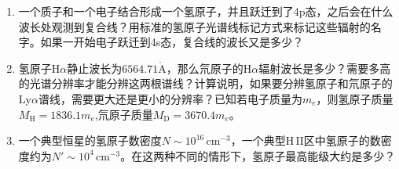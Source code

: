 \documentclass[a4paper]{article}
\begin{document}
\begin{enumerate}
    \item[4.] 一个质子和一个电子结合形成一个氢原子，并且跃迁到了4p态，之后会在什么波长处观测到复合线？用标准的氢原子光谱线标记方式来标记这些辐射的名字。如果一开始电子跃迁到4s态，复合线的波长又是多少？

    \item[5.] 氢原子$\mathrm{H}\alpha$静止波长为$6564.71\mathring{\mathrm{A}}$，那么氘原子的$\mathrm{H}\alpha$辐射波长是多少？需要多高的光谱分辨率才能分辨这两根谱线？计算说明，如果要分辨氢原子和氘原子的$\mathrm{Ly}\alpha$谱线，需要更大还是更小的分辨率？已知若电子质量为$m_e$，则氢原子质量$M_{\mathrm{H}}=1836.1m_e$,氘原子质量$M_{\mathrm{D}}=3670.4m_e$。

    \item[6.] 一个典型恒星的氢原子数密度$N\sim10^{16}\,\mathrm{cm^{-3}}$，一个典型$\mathrm{H\,II}$区中氢原子的数密度约为$N'\sim10^{4}\,\mathrm{cm^{-3}}$。在这两种不同的情形下，氢原子最高能级大约是多少？

\end{enumerate}
\end{document}
